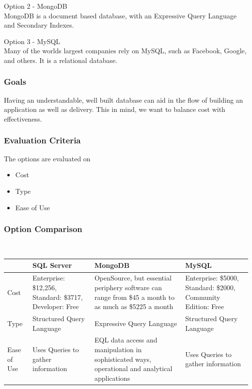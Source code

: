 \documentclass[onecolumn, draftclsnofoot,10pt, compsoc]{IEEEtran}
\begin{document}
{\medskip
\noindent Option 2 - MongoDB \\
\noindent MongoDB is a document based database, with an Expressive Query Language and Secondary Indexes. \cite{MongoDB}  

\medskip
\noindent Option 3 - MySQL \\
\noindent Many of the worlds largest companies rely on MySQL, such as Facebook, Google, and others. It is a relational database. \cite{MySQL}  

\subsubsection{Goals}
\noindent Having an understandable, well built database can aid in the flow of building an application as well as delivery. This in mind, we want to balance cost with effectiveness. 


\subsubsection{Evaluation Criteria} 
\noindent The options are evaluated on
\begin{itemize}
\item Cost
\item Type
\item Ease of Use
\end{itemize}



\subsubsection{Option Comparison} ~\\
\tablehead{}
\begin{supertabular}{|p{2.5cm}|p{4.5cm}|p{4.5cm}|p{4.5cm}|}
\hline & SQL Server & MongoDB & MySQL\\ \hline
Cost & Enterprise: \$12,256, Standard: \$3717, Developer: Free & OpenSource, but essential periphery software can range from \$45 a month to as much as \$5225 a month & Enterprise: \$5000, Standard: \$2000, Community Edition: Free \\ \hline
Type & Structured Query Language & Expressive Query Language & Structured Query Language\\ \hline
Ease of Use & Uses Queries to gather information & EQL data access and manipulation in sophisticated ways, operational and analytical applications \cite{ibmbpnetwork} & Uses Queries to gather information \\ \hline
\end{supertabular}

}
\end{document}
